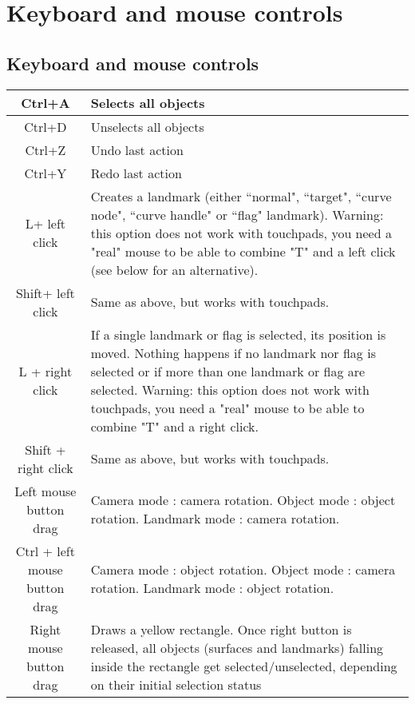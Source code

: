 \chapter{Keyboard and mouse controls}
\minitoc  

 \section{Keyboard and mouse controls}
\begin{tabularx}{\linewidth}{ | c | X | }
 \hline			
   Ctrl+A & Selects all objects \\ \hline				
   Ctrl+D & Unselects all objects \\ \hline				
	 Ctrl+Z & Undo last action \\ \hline				
	Ctrl+Y & Redo last action \\ \hline				
   L+ left click & Creates a landmark (either ``normal", ``target", ``curve node", ``curve handle" or ``flag" landmark). Warning: this option does not work with touchpads, you need a "real" mouse to be able to combine "T" and a left click (see below for an alternative).\\ \hline			
	Shift+ left click & Same as above, but works with touchpads.\\ \hline			
L + right click & If a single landmark or flag is selected, its position is
moved. Nothing happens if no landmark nor flag is selected
or if more than one landmark or flag are selected. Warning: this option does not work with touchpads, you need a "real" mouse to be able to combine "T" and a right click. \\ \hline			
Shift + right click & Same as above, but works with touchpads.\\ \hline			

Left mouse button drag 
& Camera mode : camera rotation.\newline
 Object mode : object rotation.\newline
Landmark mode : camera rotation. \\ \hline			

Ctrl + left mouse button drag 
& Camera mode : object rotation.\newline
 Object mode : camera rotation.\newline
 Landmark mode : object rotation. \\ \hline	
		
Right mouse button drag & Draws a yellow rectangle. Once right button is
released, all objects (surfaces and landmarks)
falling inside the rectangle get selected/unselected,
depending on their initial selection status \\ \hline	
		


\end{tabularx}
